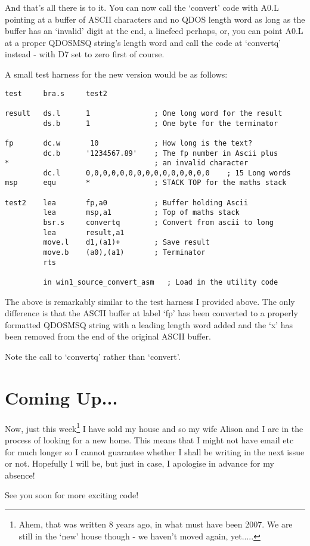 And that's all there is to it. You can now call the `convert' code with A0.L
pointing at a buffer of ASCII characters and no QDOS length word as long as the
buffer has an `invalid' digit at the end, a linefeed perhaps, or, you can point
A0.L at a proper QDOSMSQ string's length word and call the code at `convertq'
instead - with D7 set to zero first of course.

A small test harness for the new version would be as follows:

\begin{lstlisting}[firstnumber=1,caption={Better ASCII to LONG Converter - Test Harness}]
test     bra.s     test2

result   ds.l      1               ; One long word for the result
         ds.b      1               ; One byte for the terminator

fp       dc.w       10             ; How long is the text?
         dc.b      '1234567.89'    ; The fp number in Ascii plus 
*                                  ; an invalid character
         dc.l      0,0,0,0,0,0,0,0,0,0,0,0,0,0,0    ; 15 Long words 
msp      equ       *               ; STACK TOP for the maths stack

test2    lea       fp,a0           ; Buffer holding Ascii
         lea       msp,a1          ; Top of maths stack
         bsr.s     convertq        ; Convert from ascii to long
         lea       result,a1
         move.l    d1,(a1)+        ; Save result
         move.b    (a0),(a1)       ; Terminator
         rts

         in win1_source_convert_asm   ; Load in the utility code
\end{lstlisting}

The above is remarkably similar to the test harness I provided above. The only difference
is that the ASCII buffer at label `fp' has been converted to a properly formatted QDOSMSQ
string with a leading length word added and the `x' has been removed from the end of the
original ASCII buffer.

Note the call to `convertq' rather than `convert'.

\section{Coming Up...}
\label{ch18-the-end}%

Now, just this week\footnote{Ahem, that was written 8 years ago, in what must have been 2007. We are still in the `new' house though - we haven't moved again, yet.....} I have sold my house and so my wife Alison and I are in the
process of looking for a new home. This means that I might not have email etc
for much longer so I cannot guarantee whether I shall be writing in the next
issue or not. Hopefully I will be, but just in case, I apologise in advance for
my absence!

See you soon for more exciting code!


